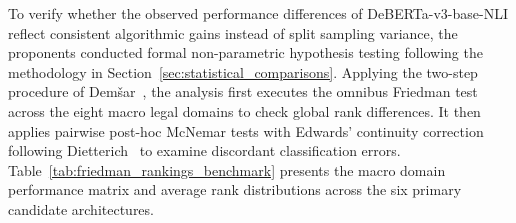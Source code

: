 To verify whether the observed performance differences of DeBERTa-v3-base-NLI reflect consistent algorithmic gains instead of split sampling variance, the proponents conducted formal non-parametric hypothesis testing following the methodology in Section~\ref{sec:statistical_comparisons}. Applying the two-step procedure of Dem{\v{s}}ar~\cite{demsar2006statistical}, the analysis first executes the omnibus Friedman test~\cite{friedman1937use} across the eight macro legal domains to check global rank differences. It then applies pairwise post-hoc McNemar tests with Edwards' continuity correction~\cite{mcnemar1947note, edwards1948note} following Dietterich~\cite{dietterich1998approximate} to examine discordant classification errors. Table~\ref{tab:friedman_rankings_benchmark} presents the macro domain performance matrix and average rank distributions across the six primary candidate architectures.

